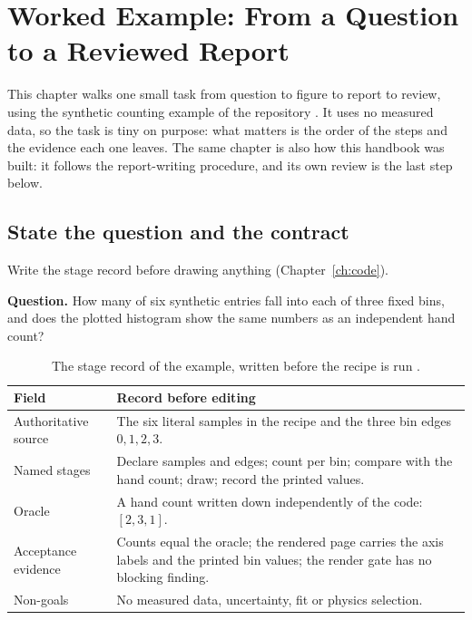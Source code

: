 \chapter{Worked Example: From a Question to a Reviewed Report}\label{ch:example}

This chapter walks one small task from question to figure to report to review, using the
synthetic counting example of the repository \cite[Two renderers, one evidence
  contract]{example:custom-plotting}. It uses no measured data, so the task is tiny on
purpose: what matters is the order of the steps and the evidence each one leaves. The
same chapter is also how this handbook was built: it follows the report-writing
procedure, and its own review is the last step below.

\section{State the question and the contract}

\begin{headline}
  Write the stage record before drawing anything (Chapter~\ref{ch:code}).
\end{headline}

\textbf{Question.} How many of six synthetic entries fall into each of three fixed bins, and
does the plotted histogram show the same numbers as an independent hand count?

\begin{table}[H]
  \small
  \begin{tabularx}{\textwidth}{L{0.27\textwidth}Y}
    \toprule Field & Record before editing \\
    \midrule
    Authoritative source & The six literal samples in the recipe and the three bin edges
    $0,1,2,3$. \\
    Named stages & Declare samples and edges; count per bin; compare with the hand count;
    draw; record the printed values. \\
    Oracle & A hand count written down independently of the code: $[2,3,1]$. \\
    Acceptance evidence & Counts equal the oracle; the rendered page carries the axis
    labels and the printed bin values; the render gate has no blocking finding. \\
    Non-goals & No measured data, uncertainty, fit or physics selection. \\
    \bottomrule
  \end{tabularx}
  \caption{The stage record of the example, written before the recipe is run
    \cite[Establish the scientific contract]{skill:coding}.}
  \label{tab:example-stage}
\end{table}


